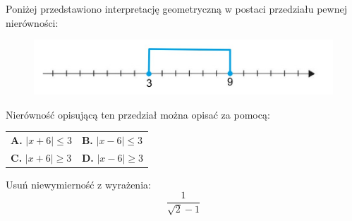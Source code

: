 \documentclass[12pt,a4paper]{article}
\theoremstyle{break}
\begin{document}
	\begin{zad}
		 Poniżej przedstawiono interpretację geometryczną w postaci przedziału pewnej nierówności:
	\end{zad}
	
	\begin{figure}[h]
		\centering
		\includegraphics[scale=0.5]{z1_1.jpeg}
	\end{figure}
	
	Nierówność opisującą ten przedział można opisać za pomocą:
	
	\vspace{0.5cm}
	\begin{tabular}{p{5cm} p{5cm}}
		\textbf{A. }$|x+6|\leq3$&
		\textbf{B. }$|x-6|\leq3$\\
		\textbf{C. }$|x+6|\geq3$&
		\textbf{D. }$|x-6|\geq3$\\
	\end{tabular}
	\begin{zad}
		Usuń niewymierność z wyrażenia:
		$$\frac{1}{\sqrt{2}-1}$$
	\end{zad}
\end{document}
